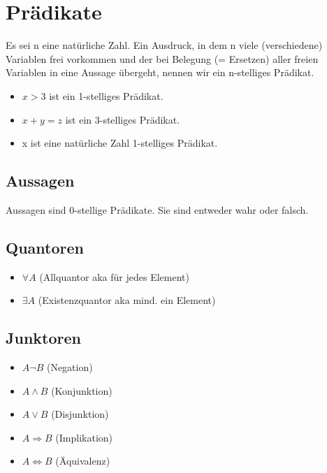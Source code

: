 \section{Prädikate}
Es sei n eine natürliche Zahl. Ein Ausdruck, in dem n viele
(verschiedene) Variablen frei vorkommen und der bei Belegung (=
Ersetzen) aller freien Variablen in eine Aussage übergeht, nennen wir
ein n-stelliges Prädikat.
\begin{itemize}
    \item $x > 3$ ist ein 1-stelliges Prädikat.
    \item $x + y = z$ ist ein 3-stelliges Prädikat.
    \item x ist eine natürliche Zahl 1-stelliges Prädikat.
\end{itemize}
\subsection{Aussagen}
Aussagen sind 0-stellige Prädikate. Sie sind entweder wahr oder falsch.
\subsection{Quantoren}
\begin{itemize}
    \item \(\forall A\) (Allquantor aka für jedes Element)
    \item \(\exists A\) (Existenzquantor aka mind. ein Element)
\end{itemize}
\subsection{Junktoren}
\begin{itemize}
    \item \(A \neg B\) (Negation)
    \item \(A \wedge B\) (Konjunktion)
    \item \(A \vee B\) (Disjunktion)
    \item \(A \Rightarrow B\) (Implikation)
    \item \(A \Leftrightarrow B\) (Äquivalenz)
\end{itemize}

